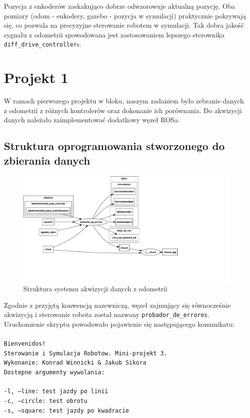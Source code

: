 \documentclass{mwrep}
\begin{document}
Pozycja z enkoderów zaskakująco dobrze odwzorowuje aktualną pozycję. Oba pomiary (odom - enkodery, gazebo - pozycja w symulacji)
praktycznie pokrywają się, co pozwala na precyzyjne sterowanie robotem w symulacji. 
Tak dobra jakość sygnału z odometrii spowodowana jest zastosowaniem lepszego sterownika \texttt{diff\_{}drive\_{}controller}s.

\chapter{Projekt 1}
\label{pro1}
W ramach pierwszego projektu w bloku, naszym zadaniem było zebranie danych 
z odometrii z różnych kontrolerów oraz dokonanie ich porównania. Do akwizycji 
danych należało zaimplementować dodatkowy węzeł ROSa.

\section{Struktura oprogramowania stworzonego do zbierania danych}
\label{pro1_struct}

\begin{figure}[H]
	\centering
	\leftskip-0.6cm
	\includegraphics[scale=0.33]{./figures/pro1/pro1_system.pdf}
	\caption{Struktura systemu akwizycji danych z odometrii}
\end{figure}

Zgodnie z przyjętą konwencją nazewniczą, węzeł zajmujący się równocześnie akwizycją
i sterowanie robota został nazwany \texttt{probador\_{}de\_{}errores}. Uruchomienie 
skryptu powodowało pojawienie się następującego komunikatu:\\
\\
\texttt{Bienvenidos!}\\
\texttt{Sterowanie i Symulacja Robotow. Mini-projekt 3.}\\
\texttt{Wykonanie: Konrad Winnicki \& Jakub Sikora}\\
\texttt{Dostepne argumenty wywolania:}\\
\\
\texttt{-l, --line:                    test jazdy po linii}\\
\texttt{-c, --circle:                  test obrotu}\\
\texttt{-s, --square:                  test jazdy po kwadracie}\\
\end{document}
